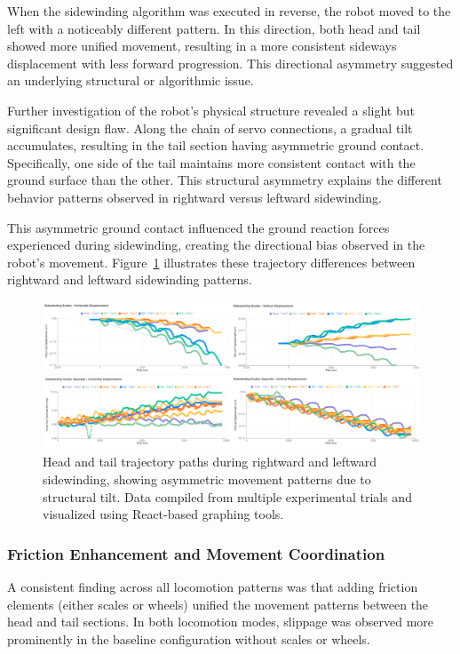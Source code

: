 \documentclass[12pt,a4paper]{report}
\begin{document}
When the sidewinding algorithm was executed in reverse, the robot moved to the left with a noticeably different pattern. In this direction, both head and tail showed more unified movement, resulting in a more consistent sideways displacement with less forward progression. This directional asymmetry suggested an underlying structural or algorithmic issue.

Further investigation of the robot's physical structure revealed a slight but significant design flaw. Along the chain of servo connections, a gradual tilt accumulates, resulting in the tail section having asymmetric ground contact. Specifically, one side of the tail maintains more consistent contact with the ground surface than the other. This structural asymmetry explains the different behavior patterns observed in rightward versus leftward sidewinding.

This asymmetric ground contact influenced the ground reaction forces experienced during sidewinding, creating the directional bias observed in the robot's movement. Figure~\ref{fig:sidewinding_analysis} illustrates these trajectory differences between rightward and leftward sidewinding patterns.

\begin{figure}[H]
    \centering
    \includegraphics[width=1\textwidth]{media/sidewinding_direction_comparison.png}
    \caption{Head and tail trajectory paths during rightward and leftward sidewinding, showing asymmetric movement patterns due to structural tilt. Data compiled from multiple experimental trials and visualized using React-based graphing tools.}
    \label{fig:sidewinding_analysis}
\end{figure}

\subsubsection{Friction Enhancement and Movement Coordination}
A consistent finding across all locomotion patterns was that adding friction elements (either scales or wheels) unified the movement patterns between the head and tail sections. In both locomotion modes, slippage was observed more prominently in the baseline configuration without scales or wheels.
\end{document}
